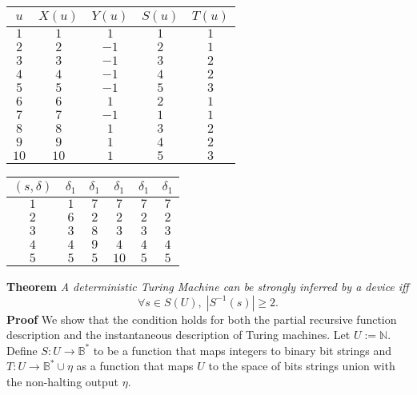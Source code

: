 \documentclass[11pt]{article}
\newcommand{\N}{\mathbb{N}}
\newcommand{\B}{\mathbb{B}}
\begin{document}
 \begin{center}
 \begin{tabular}{ c||c|c|c|c } 

 $ u $ & $ X(u) $ & $ Y(u) $ & $ S(u) $ & $ T(u) $ \\ 
 \hline
 \hline
 $ 1 $ & $ 1 $ & $ 1 $ & $ 1 $ & $ 1 $ \\
 \hline
 $ 2 $ & $ 2 $ & $ -1 $ & $ 2 $ & $ 1 $ \\
 \hline
 $ 3 $ & $ 3 $ & $ -1 $ & $ 3 $ & $ 2 $ \\
 \hline
 $ 4 $ & $ 4 $ & $ -1 $ & $ 4 $ & $ 2 $ \\
 \hline
 $ 5 $ & $ 5 $ & $ -1 $ & $ 5 $ & $ 3 $ \\
 \hline
 $ 6 $ & $ 6 $ & $ 1 $ & $ 2 $ & $ 1 $ \\
 \hline
 $ 7 $ & $ 7 $ & $ -1 $ & $ 1 $ & $ 1 $ \\
 \hline
 $ 8 $ & $ 8 $ & $ 1 $ & $ 3 $ & $ 2 $ \\
 \hline
 $ 9 $ & $ 9 $ & $ 1 $ & $ 4 $ & $ 2 $ \\
 \hline
 $ 10 $ & $ 10 $ & $ 1 $ & $ 5 $ & $ 3 $ \\ 
 \end{tabular} 
 \quad
 \begin{tabular}{ c||c|c|c|c|c } 

 $ (s, \delta) $ & $ \delta_1 $ & $ \delta_1 $ & $ \delta_1 $ & $ \delta_1 $ & $ \delta_1 $ \\ 
 \hline
 \hline
 $ 1 $ & $ 1 $ & $ 7 $ & $ 7 $ & $ 7 $ & $ 7 $ \\
 \hline
 $ 2 $ & $ 6 $ & $ 2 $ & $ 2 $ & $ 2 $ & $ 2 $ \\
 \hline
 $ 3 $ & $ 3 $ & $ 8 $ & $ 3 $ & $ 3 $ & $ 3 $ \\
 \hline
 $ 4 $ & $ 4 $ & $ 9 $ & $ 4 $ & $ 4 $ & $ 4 $ \\
 \hline 
 $ 5 $ & $ 5 $ & $ 5 $ & $ 10 $ & $ 5 $ & $ 5 $ \\
 
 \end{tabular}
 \end{center} 

\bigskip 
\bigskip
\textbf{Theorem} \quad \textit{A deterministic Turing Machine can be strongly inferred by a device iff} 
$$\forall s \in S(U),\; |S^{-1}(s)| \geq 2. $$ 
\textbf{Proof} \quad We show that the condition holds for both the partial recursive function description and the instantaneous description of Turing machines. Let $ U := \N $. Define $ S: U \rightarrow \B^{*} $ to be a function that maps integers to binary bit strings and $ T: U \rightarrow \B^{*} \cup \eta$ as a function that maps $ U $ to the space of bits strings union with the non-halting output $ \eta $. \\
\end{document}
